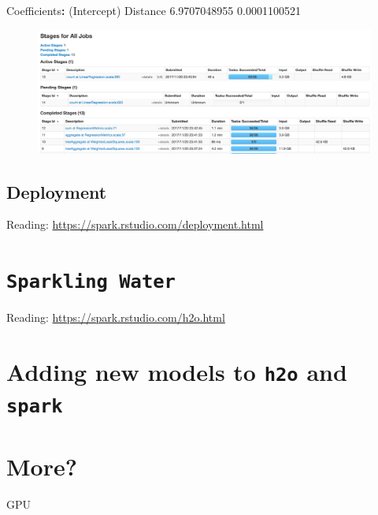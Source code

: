 \documentclass[]{book}
\newenvironment{Shaded}{\begin{snugshade}}{\end{snugshade}}
\newcommand{\FloatTok}[1]{\textcolor[rgb]{0.00,0.00,0.81}{#1}}
\newcommand{\StringTok}[1]{\textcolor[rgb]{0.31,0.60,0.02}{#1}}
\newcommand{\OperatorTok}[1]{\textcolor[rgb]{0.81,0.36,0.00}{\textbf{#1}}}
\newcommand{\NormalTok}[1]{#1}
\theoremstyle{definition}
\theoremstyle{definition}
\theoremstyle{definition}
\theoremstyle{remark}
\begin{document}
\begin{Shaded}
\begin{Highlighting}[]
\NormalTok{Coefficients}\OperatorTok{:}
\StringTok{ }\NormalTok{(Intercept)     Distance }
\FloatTok{6.9707048955} \FloatTok{0.0001100521}
\end{Highlighting}
\end{Shaded}

\begin{figure}

{\centering \includegraphics[width=39.44in]{images/ch6_spark_jobs} 

}

\end{figure}

\subsection{Deployment}\label{deployment}

Reading: \url{https://spark.rstudio.com/deployment.html}

\section{\texorpdfstring{\texttt{Sparkling\ Water}}{Sparkling Water}}\label{sparkling-water}

Reading: \url{https://spark.rstudio.com/h2o.html}

\section{\texorpdfstring{Adding new models to \texttt{h2o} and
\texttt{spark}}{Adding new models to h2o and spark}}\label{adding-new-models-to-h2o-and-spark}

\section{More?}\label{more}

GPU
\end{document}
